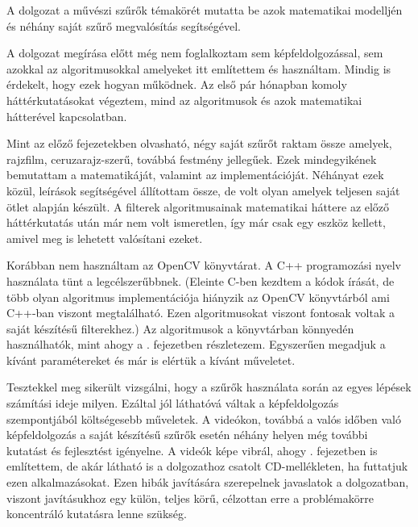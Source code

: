 

A dolgozat a művészi szűrők témakörét mutatta be azok matematikai modelljén és néhány saját szűrő megvalósítás segítségével.

A dolgozat megírása előtt még nem foglalkoztam sem képfeldolgozással, sem azokkal az algoritmusokkal amelyeket itt említettem és használtam. Mindig is érdekelt, hogy ezek hogyan működnek. Az első pár hónapban komoly háttérkutatásokat végeztem, mind az algoritmusok és azok matematikai hátterével kapcsolatban.

Mint az előző fejezetekben olvasható, négy saját szűrőt raktam össze amelyek, rajzfilm, ceruzarajz-szerű, továbbá festmény jellegűek. Ezek mindegyikének bemutattam a matematikáját, valamint az implementációját. Néhányat ezek közül, leírások segítségével állítottam össze, de volt olyan amelyek teljesen saját ötlet alapján készült. A filterek algoritmusainak matematikai háttere az előző háttérkutatás után már nem volt ismeretlen, így már csak egy eszköz kellett, amivel meg is lehetett valósítani ezeket. 

Korábban nem használtam az OpenCV könyvtárat. A C++ programozási nyelv használata tünt a legcélszerűbbnek. (Eleinte C-ben kezdtem a kódok írását, de több olyan algoritmus implementációja hiányzik az OpenCV könyvtárból ami C++-ban viszont megtalálható. Ezen algoritmusokat viszont fontosak voltak a saját készítésű filterekhez.) Az algoritmusok a könyvtárban könnyedén használhatók, mint ahogy a . fejezetben részletezem. Egyszerűen megadjuk a kívánt paramétereket és már is elértük a kívánt műveletet.

Tesztekkel meg sikerült vizsgálni, hogy a szűrők használata során az egyes lépések számítási ideje milyen. Ezáltal jól láthatóvá váltak a képfeldolgozás szempontjából költségesebb műveletek. A videókon, továbbá a valós időben való képfeldolgozás a saját készítésű szűrők esetén néhány helyen még további kutatást és fejlesztést igényelne. A videók képe vibrál, ahogy . fejezetben is említettem, de akár látható is a dolgozathoz csatolt CD-mellékleten, ha futtatjuk ezen alkalmazásokat. Ezen hibák javítására szerepelnek javaslatok a dolgozatban, viszont javításukhoz egy külön, teljes körű, célzottan erre a problémakörre koncentráló kutatásra lenne szükség.
